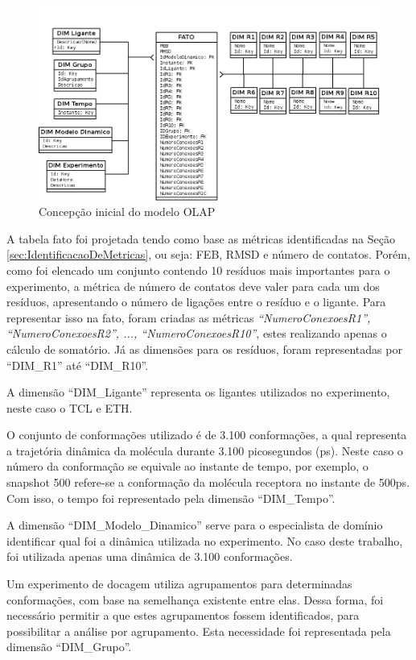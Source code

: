 \begin{figure}[h]
        \center
        \includegraphics[scale=0.45]{images/Modelo_OLAP.png}
        \caption{Concepção inicial do modelo OLAP}
        \label{fig:ConcepcaoModeloOLAP}
\end{figure}

A tabela fato foi projetada tendo como base as métricas identificadas na Seção \ref{sec:IdentificacaoDeMetricas}, ou seja: FEB, RMSD e número de contatos. Porém, como foi elencado um conjunto contendo 10 resíduos mais importantes para o experimento, a métrica de número de contatos deve valer para cada um dos resíduos, apresentando o número de ligações entre o resíduo e o ligante. Para representar isso na fato, foram criadas as métricas \emph{``NumeroConexoesR1'', ``NumeroConexoesR2'', ..., ``NumeroConexoesR10''}, estes realizando apenas o cálculo de somatório. Já as dimensões para os resíduos, foram representadas por ``DIM\_R1'' até ``DIM\_R10''.

A dimensão ``DIM\_Ligante'' representa os ligantes utilizados no experimento, neste caso o TCL e ETH.

O conjunto de conformações utilizado é de 3.100 conformações, a qual representa a trajetória dinâmica da molécula durante 3.100 picosegundos (ps). Neste caso o número da conformação se equivale ao instante de tempo, por exemplo, o snapshot 500 refere-se a conformação da molécula receptora no instante de 500ps. Com isso, o tempo foi representado pela dimensão ``DIM\_Tempo''. 

A dimensão ``DIM\_Modelo\_Dinamico'' serve para o especialista de domínio identificar qual foi a dinâmica utilizada no experimento. No caso deste trabalho, foi utilizada apenas uma dinâmica de 3.100 conformações.

Um experimento de docagem utiliza agrupamentos para determinadas conformações, com base na semelhança existente entre elas. Dessa forma, foi necessário permitir a que estes agrupamentos fossem identificados, para possibilitar a análise por agrupamento. Esta necessidade foi representada pela dimensão ``DIM\_Grupo''.

